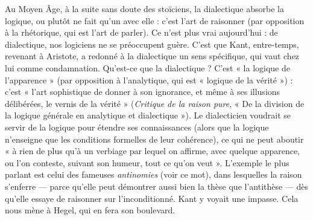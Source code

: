 Au Moyen Âge, à la suite sans doute des stoïciens, la dialectique absorbe
la logique, ou plutôt ne fait qu’un avec elle : c’est l’art de raisonner (par opposition
à la rhétorique, qui est l’art de parler). Ce n’est plus vrai aujourd’hui :
de dialectique, nos logiciens ne se préoccupent guère. C’est que Kant, entre-temps,
revenant à Aristote, a redonné à la dialectique un sens spécifique, qui
vaut chez lui comme condamnation. Qu'est-ce que la dialectique ? C’est « la
logique de l’apparence » (par opposition à l’analytique, qui est « logique de la
vérité ») : c’est « l’art sophistique de donner à son ignorance, et même à ses
illusions délibérées, le vernis de la vérité » ({\it Critique de la raison pure}, « De la
division de la logique générale en analytique et dialectique »). Le dialecticien
voudrait se servir de la logique pour étendre ses connaissances (alors que la
logique n’enseigne que les conditions formelles de leur cohérence), ce qui ne
peut aboutir « à rien de plus qu’à un verbiage par lequel on affirme, avec
quelque apparence, ou l’on conteste, suivant son humeur, tout ce qu’on
veut ». L'exemple le plus parlant est celui des fameuses {\it antinomies} (voir ce
mot), dans lesquelles la raison s’enferre — parce qu’elle peut démontrer aussi
bien la thèse que l’antithèse — dès qu’elle essaye de raisonner sur l’inconditionné.
Kant y voyait une impasse. Cela nous mène à Hegel, qui en fera son
boulevard.


